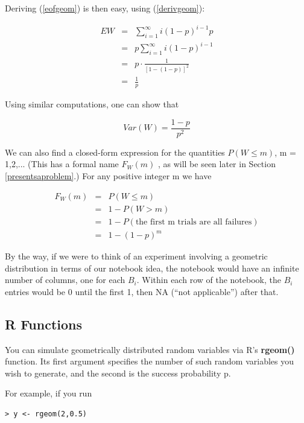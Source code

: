 Deriving (\ref{eofgeom}) is then easy, using (\ref{derivgeom}):

\begin{eqnarray}
EW &=& \sum_{i=1}^{\infty} i (1-p)^{i-1} p \\ 
&=& p \sum_{i=1}^{\infty} i (1-p)^{i-1} \\ 
&=& p \cdot \frac{1}{[1-(1-p)]^2} \\
&=& \frac{1}{p}  \label{meangeom}
\end{eqnarray}

Using similar computations, one can show that

\begin{equation}
\label{vargeom}
Var(W) = \frac{1-p}{p^2}
\end{equation}

We can also find a closed-form expression for the quantities $P(W \leq
m)$, m = 1,2,...  (This has a formal name $F_W(m)$ , as will be seen
later in Section \ref{presentsaproblem}.)  For any positive integer m we
have

\begin{eqnarray}
F_W(m) &=& P(W \leq m) \\
&=& 1 - P(W > m) \\
&=& 1 - P(\textrm{the first m trials are all failures}) \\
&=& 1 -  (1-p)^{m}
\label{geomcdf}
\end{eqnarray}

By the way, if we were to think of an experiment involving a geometric
distribution in terms of our notebook idea, the notebook would have an
infinite number of columns, one for each $B_i$.  Within each row of the
notebook, the $B_i$ entries would be 0 until the first 1, then NA (``not
applicable'') after that.

\subsection{R Functions} 

You can simulate geometrically distributed random variables via R's {\bf
rgeom()} function.  Its first argument specifies the number of such
random variables you wish to generate, and the second is the success
probability p.

For example, if you run

\begin{Verbatim}[fontsize=\relsize{-2}]
> y <- rgeom(2,0.5)
\end{Verbatim}

